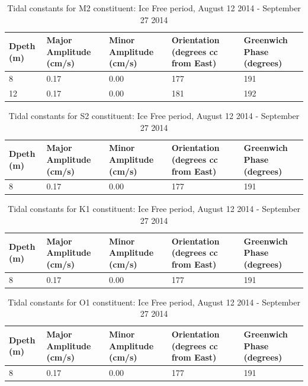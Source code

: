 \documentclass[12pt]{dforeport}
\begin{document}
\begin{table}[ht]
\centering
\caption[Tidal Constituents, M2, Ice Free, 2014]{Tidal constants for M2 constituent: Ice Free period, August 12 2014 - September 27 2014} 
\label{t:m2_if_2014}
\begin{tabular}{p{0.3in}p{.7in}p{.7in}p{.7in}p{.7in}}
 Dpeth (m) & Major Amplitude (cm/s) & Minor Amplitude (cm/s) & Orientation (degrees cc from East) & Greenwich Phase (degrees) \\ 
  \hline
8 & 0.17 & 0.00 & 177 & 191 \\
12 & 0.17 & 0.00 & 181 & 192 \\
   \hline
\end{tabular}
\end{table}

\begin{table}[ht]
\centering
\caption[Tidal Constituents, S2, Ice Free, 2014]{Tidal constants for S2 constituent: Ice Free period, August 12 2014 - September 27 2014} 
\label{t:s2_if_2014}
\begin{tabular}{p{0.3in}p{.7in}p{.7in}p{.7in}p{.7in}}
 Dpeth (m) & Major Amplitude (cm/s) & Minor Amplitude (cm/s) & Orientation (degrees cc from East) & Greenwich Phase (degrees) \\ 
  \hline
8 & 0.17 & 0.00 & 177 & 191 \\
   \hline
\end{tabular}
\end{table}

\begin{table}[ht]
\centering
\caption[Tidal Constituents, K1, Ice Free, 2014]{Tidal constants for K1 constituent: Ice Free period, August 12 2014 - September 27 2014} 
\label{t:k1_if_2015}
\begin{tabular}{p{0.3in}p{.7in}p{.7in}p{.7in}p{.7in}}
 Dpeth (m) & Major Amplitude (cm/s) & Minor Amplitude (cm/s) & Orientation (degrees cc from East) & Greenwich Phase (degrees) \\ 
  \hline
8 & 0.17 & 0.00 & 177 & 191 \\
   \hline
\end{tabular}
\end{table}

\begin{table}[ht]
\centering
\caption[Tidal Constituents, O1, Ice Free, 2014]{Tidal constants for O1 constituent: Ice Free period, August 12 2014 - September 27 2014} 
\label{t:o1_if_2014}
\begin{tabular}{p{0.3in}p{.7in}p{.7in}p{.7in}p{.7in}}
 Dpeth (m) & Major Amplitude (cm/s) & Minor Amplitude (cm/s) & Orientation (degrees cc from East) & Greenwich Phase (degrees) \\ 
  \hline
8 & 0.17 & 0.00 & 177 & 191 \\
   \hline
\end{tabular}
\end{table}
\end{document}
